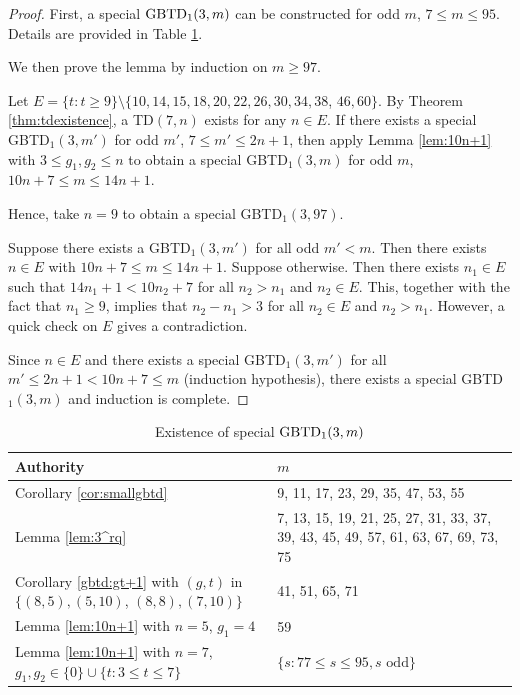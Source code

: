 \documentclass[draft, 11pt]{article}
\begin{document}
 \begin{proof}
First, a special ${\rm GBTD}_1(3,m)$ can be constructed for odd $m$, $7\le m\le 95$. Details are provided in Table \ref{authority}.

 We then prove the lemma by induction on $m\ge 97$.

 Let $E=\{t: t\geq 9\}\setminus \{10,14, 15,18,
 20, 22, 26, 30, 34, 38$, $46, 60\}$.
 By Theorem \ref{thm:tdexistence},
 a TD$(7,n)$ exists for any $n\in E$.
If there exists a special GBTD$_1(3,m')$ for odd $m'$, $7\le m'\le 2n+1$,
 then apply Lemma \ref{lem:10n+1} with $3\le g_1,g_2\le n$ to obtain
 a special GBTD$_1(3,m)$ for odd $m$, $10n+7\le m\le 14n+1$.

 Hence, take $n=9$ to obtain a special GBTD$_1(3,97)$.

 Suppose there exists a GBTD$_1(3,m')$ for all odd $m'<m$. Then there exists $n\in E$ with
 $10n+7\le m\le 14n+1$. Suppose otherwise. Then there exists $n_1\in E$ such that $14n_1+1<10n_2+7$ for all $n_2>n_1$ and $n_2\in E$.
 This, together with the fact that $n_1\ge 9$, implies that $n_2-n_1> 3$ for all $n_2\in E$ and $n_2> n_1$.
 However, a quick check on $E$ gives a contradiction.

 Since $n\in E$ and there exists a special GBTD$_1(3,m')$ for all $m'\le 2n+1< 10n+7\le m$ (induction hypothesis),
 there exists a special GBTD$_1(3,m)$ and induction is complete.
 \end{proof}

 \begin{table}
 \small
 \centering \caption{Existence of special ${\rm GBTD}_1(3,m)$}
 \label{authority}
 \begin{tabular}{p{90mm}p{60mm}}
 \hline
 Authority & $m$ \\
 \hline
 Corollary \ref{cor:smallgbtd} & 9, 11, 17, 23, 29, 35, 47, 53, 55 \\
 Lemma \ref{lem:3^rq} & 7, 13, 15, 19, 21, 25, 27, 31, 33, 37, 39, 43, 45, 49, 57, 61, 63, 67, 69, 73, 75\\
 Corollary \ref{gbtd:gt+1} with $(g,t)$ in $\{(8,5),(5,10)$, $(8,8),(7,10)\}$ & 41, 51, 65, 71\\
 Lemma \ref{lem:10n+1} with $n=5$, $g_1=4$ & 59\\
 Lemma \ref{lem:10n+1} with $n=7$, $g_1,g_2\in\{0\}\cup \{t: 3\leq t\leq 7\}$ & $\{s: 77\le s\le 95, s\mbox{ odd}\}$\\%
 \hline
 \end{tabular}
 \end{table}
 
\end{document}
